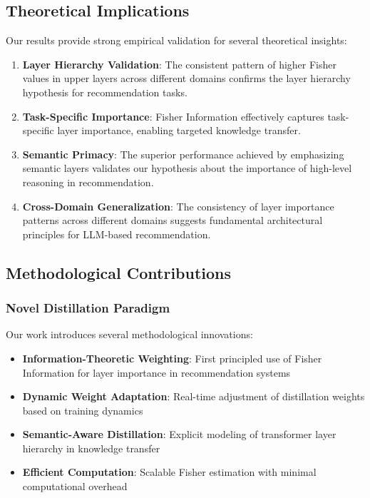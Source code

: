 \documentclass[10pt,conference]{IEEEtran}
\begin{document}
\subsection{Theoretical Implications}

Our results provide strong empirical validation for several theoretical insights:

\begin{enumerate}[leftmargin=*]
    \item \textbf{Layer Hierarchy Validation}: The consistent pattern of higher Fisher values in upper layers across different domains confirms the layer hierarchy hypothesis for recommendation tasks.
    
    \item \textbf{Task-Specific Importance}: Fisher Information effectively captures task-specific layer importance, enabling targeted knowledge transfer.
    
    \item \textbf{Semantic Primacy}: The superior performance achieved by emphasizing semantic layers validates our hypothesis about the importance of high-level reasoning in recommendation.
    
    \item \textbf{Cross-Domain Generalization}: The consistency of layer importance patterns across different domains suggests fundamental architectural principles for LLM-based recommendation.
\end{enumerate}

\subsection{Methodological Contributions}

\subsubsection{Novel Distillation Paradigm}

Our work introduces several methodological innovations:

\begin{itemize}[leftmargin=*]
    \item \textbf{Information-Theoretic Weighting}: First principled use of Fisher Information for layer importance in recommendation systems
    \item \textbf{Dynamic Weight Adaptation}: Real-time adjustment of distillation weights based on training dynamics
    \item \textbf{Semantic-Aware Distillation}: Explicit modeling of transformer layer hierarchy in knowledge transfer
    \item \textbf{Efficient Computation}: Scalable Fisher estimation with minimal computational overhead
\end{itemize}
\end{document}
